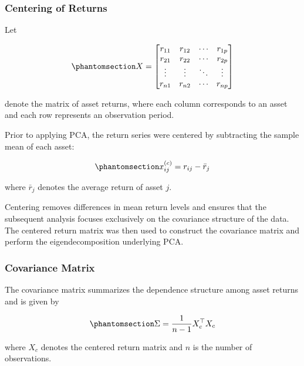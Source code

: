 \documentclass[
  12pt,
  letterpaper,
]{book}
\begin{document}
\subsubsection{Centering of Returns}\label{centering-of-returns}

Let

\begin{equation}\phantomsection\label{eq-return-matrix}{
X =
\begin{bmatrix}
r_{11} & r_{12} & \cdots & r_{1p} \\
r_{21} & r_{22} & \cdots & r_{2p} \\
\vdots & \vdots & \ddots & \vdots \\
r_{n1} & r_{n2} & \cdots & r_{np}
\end{bmatrix}
}\end{equation}

denote the matrix of asset returns, where each column corresponds to an
asset and each row represents an observation period.

Prior to applying PCA, the return series were centered by subtracting
the sample mean of each asset:

\begin{equation}\phantomsection\label{eq-centered-returns}{
x_{ij}^{(c)} = r_{ij} - \bar{r}_j
}\end{equation}

where \(\bar{r}_j\) denotes the average return of asset \(j\).

Centering removes differences in mean return levels and ensures that the
subsequent analysis focuses exclusively on the covariance structure of
the data. The centered return matrix was then used to construct the
covariance matrix and perform the eigendecomposition underlying PCA.

\subsubsection{Covariance Matrix}\label{covariance-matrix}

The covariance matrix summarizes the dependence structure among asset
returns and is given by

\begin{equation}\phantomsection\label{eq-covariance-matrix}{
\Sigma = \frac{1}{n-1} X_c^\top X_c
}\end{equation}

where \(X_c\) denotes the centered return matrix and \(n\) is the number
of observations.
\end{document}
